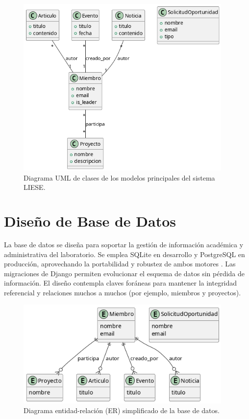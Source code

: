 \begin{figure}[H]
	\centering
	\includegraphics[width=0.95\textwidth]{uml/modelos-datos.png}
	\caption{Diagrama UML de clases de los modelos principales del sistema LIESE.}
\end{figure}
\newpage
\section{Diseño de Base de Datos}
La base de datos se diseña para soportar la gestión de información académica y administrativa del laboratorio. Se emplea SQLite en desarrollo y PostgreSQL en producción, aprovechando la portabilidad y robustez de ambos motores \cite{postgresql-docs}. Las migraciones de Django permiten evolucionar el esquema de datos sin pérdida de información. El diseño contempla claves foráneas para mantener la integridad referencial y relaciones muchos a muchos (por ejemplo, miembros y proyectos).

\begin{figure}[H]
	\centering
	\includegraphics[width=0.95\textwidth]{uml/diagrama-er.png}
	\caption{Diagrama entidad-relación (ER) simplificado de la base de datos.}
\end{figure}
